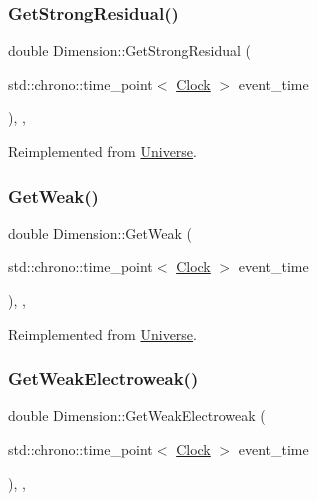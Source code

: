 \subsubsection{\texorpdfstring{Get\+Strong\+Residual()}{GetStrongResidual()}}
{\footnotesize\ttfamily double Dimension\+::\+Get\+Strong\+Residual (\begin{DoxyParamCaption}\item[{std\+::chrono\+::time\+\_\+point$<$ \mbox{\hyperlink{universe_8h_a0ef8d951d1ca5ab3cfaf7ab4c7a6fd80}{Clock}} $>$}]{event\+\_\+time }\end{DoxyParamCaption})\hspace{0.3cm}{\ttfamily [inline]}, {\ttfamily [final]}, {\ttfamily [virtual]}}



Reimplemented from \mbox{\hyperlink{classUniverse_af0f4b81950061e63c2855eb40957a5b1}{Universe}}.

\mbox{\label{classDimension_a656ce92d07ea600cc0ec53865ad515e2}} 
\subsubsection{\texorpdfstring{Get\+Weak()}{GetWeak()}}
{\footnotesize\ttfamily double Dimension\+::\+Get\+Weak (\begin{DoxyParamCaption}\item[{std\+::chrono\+::time\+\_\+point$<$ \mbox{\hyperlink{universe_8h_a0ef8d951d1ca5ab3cfaf7ab4c7a6fd80}{Clock}} $>$}]{event\+\_\+time }\end{DoxyParamCaption})\hspace{0.3cm}{\ttfamily [inline]}, {\ttfamily [final]}, {\ttfamily [virtual]}}



Reimplemented from \mbox{\hyperlink{classUniverse_a4476b7e0a3fc1764909f556257fd9ec7}{Universe}}.

\mbox{\label{classDimension_a5bb5a164564013a60728854cc2e5ddb3}} 
\subsubsection{\texorpdfstring{Get\+Weak\+Electroweak()}{GetWeakElectroweak()}}
{\footnotesize\ttfamily double Dimension\+::\+Get\+Weak\+Electroweak (\begin{DoxyParamCaption}\item[{std\+::chrono\+::time\+\_\+point$<$ \mbox{\hyperlink{universe_8h_a0ef8d951d1ca5ab3cfaf7ab4c7a6fd80}{Clock}} $>$}]{event\+\_\+time }\end{DoxyParamCaption})\hspace{0.3cm}{\ttfamily [inline]}, {\ttfamily [final]}, {\ttfamily [virtual]}}



